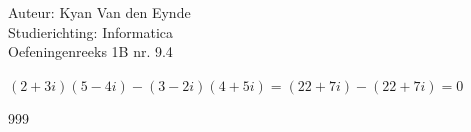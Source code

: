\documentclass[a4paper]{article}
\begin{document}
  
\noindent \large Auteur: Kyan Van den Eynde \\
\noindent \large Studierichting: Informatica\\
\noindent \large Oefeningenreeks 1B nr. 9.4\\

\medskip

\normalsize

$(2+3i)(5-4i)-(3-2i)(4+5i) = (22+7i)-(22+7i) = 0$\\

\begin{thebibliography}{999}
\end{thebibliography}
\end{document}
